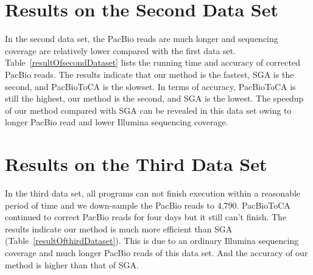 \section{Results on the Second Data Set}

In the second data set, the PacBio reads are much longer and sequencing coverage are relatively lower compared with the first data set. Table~\ref{resultOfsecondDataset} lists the running time and accuracy of corrected PacBio reads. The results indicate that our method is the fastest, SGA is the second, and PacBioToCA is the slowset. In terms of accuracy, PacBioToCA is still the highest, our method is the second, and SGA is the lowest. The speedup of our method compared with SGA can be revealed in this data set owing to longer PacBio read and lower Illumina sequencing coverage. 

\section{Results on the Third Data Set}
In the third data set, all programs can not finish execution within a reasonable period of time and we down-sample the PacBio reads to 4,790. PacBioToCA continued to correct PacBio reads for four days but it still can't finish. The results indicate our method is much more efficient than SGA (Table~\ref{resultOfthirdDataset}). This is due to an ordinary Illumina sequencing coverage and much longer PacBio reads of this data set. And the accuracy of our method is higher than that of SGA. 

\newpage

\begin{table}[h]
\centering
\caption{The datasets}
\label{thedataset}
\end{table}

